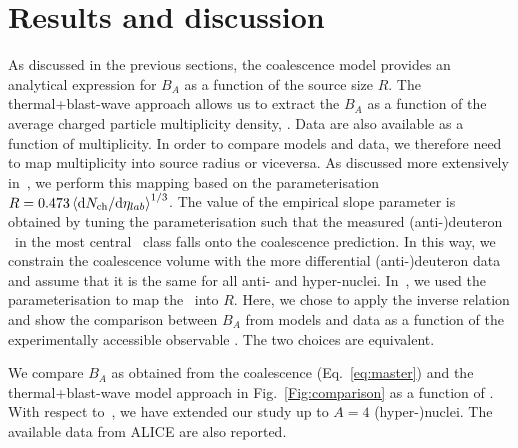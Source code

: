 \documentclass{appolb}
\begin{document}
\section{Results and discussion} \label{sec:results}
As discussed in the previous sections, the coalescence model provides an analytical expression for $B_A$ as a function of the source size $R$. 
The thermal+blast-wave approach allows us to extract the $B_A$ as a function of the average charged particle multiplicity density, \avdNdeta. Data are also available as a function of multiplicity.
In order to compare models and data, we therefore need to map multiplicity into source radius or viceversa. 
As discussed more extensively in~\cite{Bellini:2018epz}, we perform this mapping based on the parameterisation $R = 0.473 \left<\mathrm{d}N_\mathrm{ch}/\mathrm{d}\eta_{lab}\right>^{1/3}$. 
The value of the empirical slope parameter is obtained by tuning the parameterisation such that the measured (anti-)deuteron \btwo~in the most central \PbPb~class falls onto the coalescence prediction. In this way, we constrain the coalescence volume with the more differential (anti-)deuteron data and assume that it is the same for all anti- and hyper-nuclei. 
In~\cite{Bellini:2018epz}, we used the parameterisation to map the \avdNdeta~into $R$. Here, we chose to apply the inverse relation and show the comparison between $B_A$ from models and data as a function of the experimentally accessible observable  \avdNdeta. The two choices are equivalent.

We compare $B_A$ as obtained from the coalescence  (Eq.~\ref{eq:master}) and the ther\-mal+\-blast-wa\-ve model approach in Fig.~\ref{Fig:comparison} as a function of \avdNdeta. With respect to~\cite{Bellini:2018epz}, we have extended our study up to $A=4$ \mbox{(hyper-)nuclei}. The available data from ALICE are also reported. 
\end{document}
